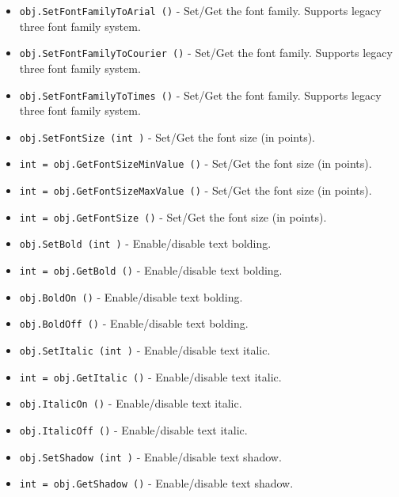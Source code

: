 \begin{itemize}
\item  \verb|obj.SetFontFamilyToArial ()| -  Set/Get the font family. Supports legacy three font family system.

\item  \verb|obj.SetFontFamilyToCourier ()| -  Set/Get the font family. Supports legacy three font family system.

\item  \verb|obj.SetFontFamilyToTimes ()| -  Set/Get the font family. Supports legacy three font family system.

\item  \verb|obj.SetFontSize (int )| -  Set/Get the font size (in points).

\item  \verb|int = obj.GetFontSizeMinValue ()| -  Set/Get the font size (in points).

\item  \verb|int = obj.GetFontSizeMaxValue ()| -  Set/Get the font size (in points).

\item  \verb|int = obj.GetFontSize ()| -  Set/Get the font size (in points).

\item  \verb|obj.SetBold (int )| -  Enable/disable text bolding.

\item  \verb|int = obj.GetBold ()| -  Enable/disable text bolding.

\item  \verb|obj.BoldOn ()| -  Enable/disable text bolding.

\item  \verb|obj.BoldOff ()| -  Enable/disable text bolding.

\item  \verb|obj.SetItalic (int )| -  Enable/disable text italic.

\item  \verb|int = obj.GetItalic ()| -  Enable/disable text italic.

\item  \verb|obj.ItalicOn ()| -  Enable/disable text italic.

\item  \verb|obj.ItalicOff ()| -  Enable/disable text italic.

\item  \verb|obj.SetShadow (int )| -  Enable/disable text shadow.

\item  \verb|int = obj.GetShadow ()| -  Enable/disable text shadow.


\end{itemize}
